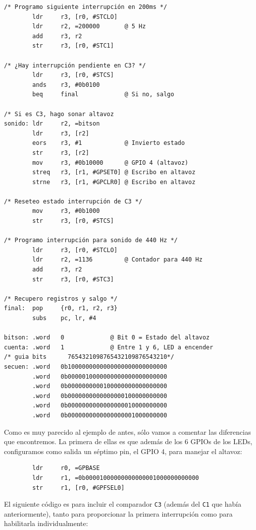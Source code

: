 \begin{lstlisting}[caption={inter4.s},label={lst:codigoPract5_4}]
/* Programo siguiente interrupción en 200ms */
        ldr     r3, [r0, #STCLO]
        ldr     r2, =200000       @ 5 Hz
        add     r3, r2
        str     r3, [r0, #STC1]

/* ¿Hay interrupción pendiente en C3? */
        ldr     r3, [r0, #STCS]
        ands    r3, #0b0100
        beq     final             @ Si no, salgo

/* Si es C3, hago sonar altavoz
sonido: ldr     r2, =bitson
        ldr     r3, [r2]
        eors    r3, #1            @ Invierto estado
        str     r3, [r2]
        mov     r3, #0b10000      @ GPIO 4 (altavoz)
        streq   r3, [r1, #GPSET0] @ Escribo en altavoz
        strne   r3, [r1, #GPCLR0] @ Escribo en altavoz

/* Reseteo estado interrupción de C3 */
        mov     r3, #0b1000
        str     r3, [r0, #STCS]

/* Programo interrupción para sonido de 440 Hz */
        ldr     r3, [r0, #STCLO]
        ldr     r2, =1136         @ Contador para 440 Hz
        add     r3, r2
        str     r3, [r0, #STC3]

/* Recupero registros y salgo */
final:  pop     {r0, r1, r2, r3}
        subs    pc, lr, #4

bitson: .word   0             @ Bit 0 = Estado del altavoz
cuenta: .word   1             @ Entre 1 y 6, LED a encender
/* guia bits      7654321098765432109876543210*/
secuen: .word   0b1000000000000000000000000000
        .word   0b0000010000000000000000000000
        .word   0b0000000000100000000000000000
        .word   0b0000000000000000100000000000
        .word   0b0000000000000000010000000000
        .word   0b0000000000000000001000000000
\end{lstlisting}

Como es muy parecido al ejemplo de antes, sólo vamos a comentar las diferencias que encontremos.
La primera de ellas es que además de los 6 GPIOs de los LEDs, configuramos como salida un séptimo
pin, el GPIO 4, para manejar el altavoz:

\begin{lstlisting}
        ldr     r0, =GPBASE
        ldr     r1, =0b00001000000000000001000000000000
        str     r1, [r0, #GPFSEL0]
\end{lstlisting}

El siguiente código es para incluir el comparador {\tt C3} (además del {\tt C1} que había
anteriormente), tanto para proporcionar la primera
interrupción como para habilitarla individualmente:

